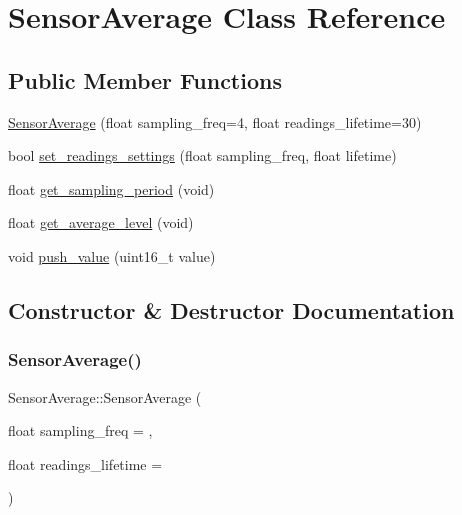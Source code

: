 \hypertarget{classSensorAverage}{}\section{Sensor\+Average Class Reference}
\label{classSensorAverage}
\subsection*{Public Member Functions}
\begin{DoxyCompactItemize}
\item 
\hyperlink{classSensorAverage_a4865484deffbe0dcd78c8aac29d79e92}{Sensor\+Average} (float sampling\+\_\+freq=4, float readings\+\_\+lifetime=30)
\item 
bool \hyperlink{classSensorAverage_a49b21efd16d229bf9d034ea625f8535b}{set\+\_\+readings\+\_\+settings} (float sampling\+\_\+freq, float lifetime)
\item 
float \hyperlink{classSensorAverage_a966608312e246981d170c45a782f74c9}{get\+\_\+sampling\+\_\+period} (void)
\item 
float \hyperlink{classSensorAverage_a61e90ca78c8cbd04444d41f60a871500}{get\+\_\+average\+\_\+level} (void)
\item 
void \hyperlink{classSensorAverage_a4d37d23977e05bc75fe6dd97cbd29cb5}{push\+\_\+value} (uint16\+\_\+t value)
\end{DoxyCompactItemize}


\subsection{Constructor \& Destructor Documentation}
\mbox{\label{classSensorAverage_a4865484deffbe0dcd78c8aac29d79e92}} 
\subsubsection{\texorpdfstring{Sensor\+Average()}{SensorAverage()}}
{\footnotesize\ttfamily Sensor\+Average\+::\+Sensor\+Average (\begin{DoxyParamCaption}\item[{float}]{sampling\+\_\+freq = {},  }\item[{float}]{readings\+\_\+lifetime = {} }\end{DoxyParamCaption})}

